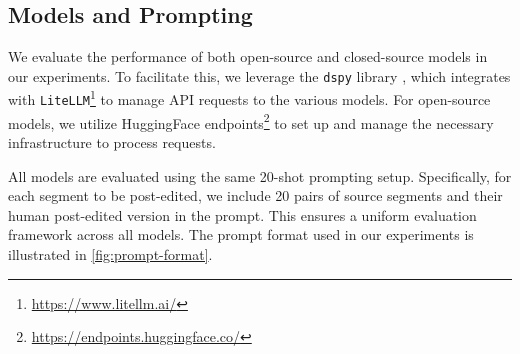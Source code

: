 \documentclass[11pt]{article}
\theoremstyle{plain}
\theoremstyle{definition}
\theoremstyle{remark}
\begin{document}
\subsection{Models and Prompting}
We evaluate the performance of both open-source and closed-source models in our experiments. To facilitate this, we leverage the \texttt{dspy} library \citep{khattab2024dspy, khattab2022demonstrate}, which integrates with \texttt{LiteLLM}\footnote{\url{https://www.litellm.ai/}} to manage API requests to the various models. For open-source models, we utilize HuggingFace endpoints\footnote{\url{https://endpoints.huggingface.co/}} to set up and manage the necessary infrastructure to process requests.

All models are evaluated using the same 20-shot prompting setup. Specifically, for each segment to be post-edited, we include 20 pairs of source segments and their human post-edited version in the prompt. This ensures a uniform evaluation framework across all models. The prompt format used in our experiments is illustrated in \cref{fig:prompt-format}.
\end{document}
